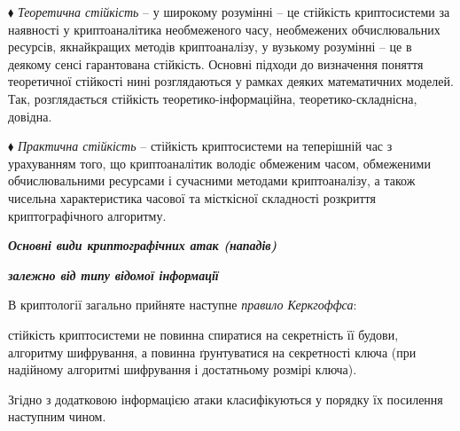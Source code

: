 \documentclass[a4paper]{article}
\newcounter{}
\begin{document}
${\blacklozenge}$ \textit{Теоретична стійкість }–  у широкому розумінні – це
стійкість криптосистеми за наявності у криптоаналітика необмеженого часу,
необмежених обчислювальних ресурсів, якнайкращих методів криптоаналізу, у
вузькому розумінні – це в деякому сенсі гарантована стійкість. Основні підходи
до визначення поняття теоретичної стійкості нині розглядаються у рамках деяких
математичних моделей. Так, розглядається стійкість теоретико-інформаційна,
теоретико-складнісна, довідна. 

${\blacklozenge}$ \textit{Практична стійкість }– стійкість криптосистеми на
теперішній час з урахуванням того, що криптоаналітик володіє обмеженим часом,
обмеженими обчислювальними ресурсами і сучасними методами криптоаналізу,  а
також чисельна характеристика часової та місткісної складності розкриття
криптографічного алгоритму. 


\bigskip


\bigskip

{\centering\bfseries\itshape
Основні види криптографічних атак (нападів)
\par}

{\centering\bfseries\itshape
 залежно від типу відомої інформації
\par}


\bigskip


\bigskip

В криптології загально прийняте  наступне \textit{правило Керкгоффса}: 

 стійкість криптосистеми не повинна спиратися на секретність її будови,
алгоритму шифрування,  а повинна ґрунтуватися на секретності ключа (при
надійному алгоритмі шифрування і достатньому розмірі ключа). 

Згідно з додатковою інформацією атаки класифікуються у порядку їх посилення
наступним чином.
\end{document}
